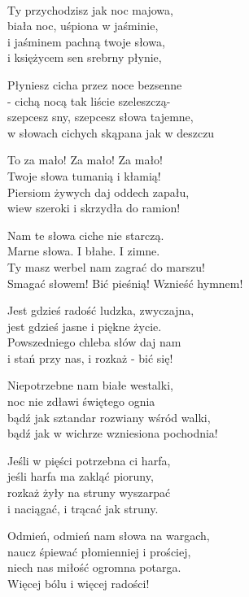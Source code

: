 \begin{text}
    ~\\
    Ty przychodzisz jak noc majowa,\\
    biała noc, uśpiona w jaśminie,\\
    i jaśminem pachną twoje słowa,\\
    i księżycem sen srebrny płynie,

    Płyniesz cicha przez noce bezsenne\\
    - cichą nocą tak liście szeleszczą-\\
    szepcesz sny, szepcesz słowa tajemne,\\
    w słowach cichych skąpana jak w deszczu
    
    To za mało! Za mało! Za mało!\\
    Twoje słowa tumanią i kłamią!\\
    Piersiom żywych daj oddech zapału,\\
    wiew szeroki i skrzydła do ramion!
    
    Nam te słowa ciche nie starczą.\\
    Marne słowa. I błahe. I zimne.\\
    Ty masz werbel nam zagrać do marszu!\\
    Smagać słowem! Bić pieśnią! Wznieść hymnem!
    
    Jest gdzieś radość ludzka, zwyczajna,\\
    jest gdzieś jasne i piękne życie.\\
    Powszedniego chleba słów daj nam\\
    i stań przy nas, i rozkaż - bić się!
    
    Niepotrzebne nam białe westalki,\\
    noc nie zdławi świętego ognia\\
    bądź jak sztandar rozwiany wśród walki,\\
    bądź jak w wichrze wzniesiona pochodnia!
    
    Jeśli w pięści potrzebna ci harfa,\\
    jeśli harfa ma zakląć pioruny,\\
    rozkaż żyły na struny wyszarpać\\
    i naciągać, i trącać jak struny.

    Odmień, odmień nam słowa na wargach,\\
    naucz śpiewać płomienniej i prościej,\\
    niech nas miłość ogromna potarga.\\
    Więcej bólu i więcej radości!


\end{text}
